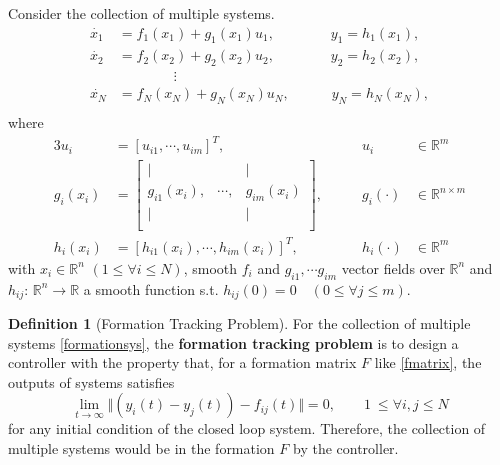 \documentclass[11pt, a4paper, oneside, openany, reqno]{book}
\theoremstyle{definition}
\newtheorem{definition}[theorem]{Definition}
\theoremstyle{remark}
\numberwithin{equation}{chapter} %
\newcommand{\R}{\ensuremath{{\mathbb R}}}
\begin{document}
Consider the collection of multiple systems.
\begin{equation}\begin{split}\label{formationsys}
	\dot{x_1} &=f_1(x_1)+g_1(x_1)u_1, \qquad\qquad  y_1 = h_1(x_1), \\
	\dot{x_2} &=f_2(x_2)+g_2(x_2)u_2, \qquad\qquad  y_2 = h_2(x_2),\\
	& \qquad \qquad \vdots \\
	\dot{x_N} &=f_N(x_N)+g_N(x_N)u_N, \qquad\quad  y_N = h_N(x_N),\\
\end{split}\end{equation} 
where
\begin{alignat*}{3}
	u_i&=\left[u_{i1} ,\cdots ,u_{im}\right]^T ,  \qquad & u_i & \in \R^m \\
	g_i(x_i)&=\left[ \begin{array}{ccc}
	\vert & & \vert \\
	g_{i1} (x_i), & \cdots , & g_{im} (x_i) \\
	\vert & & \vert \\
	\end{array} \right],   \qquad & g_i(\cdot) & \in \R^{n \times m} \\
	h_i(x_i)&=\left[h_{i1} (x_i) ,\cdots ,h_{im} (x_i) \right]^T , \qquad & h_i(\cdot) & \in \R^m  
\end{alignat*} 
with $ x_i \in \R^n $ $ (1 \leq \forall i \leq N) $,  
smooth $ f_i $ and $ g_{i1} ,\cdots g_{im} $ vector fields over $\R^n$ 
and $ h_{ij} $: $\R^n \rightarrow \R$ 
a smooth function s.t. $ h_{ij}(0)=0 \quad (0 \leq \forall j \leq m) $. 

\begin{definition}[Formation Tracking Problem]
	For the collection of multiple systems \eqref{formationsys},
	the \textbf{formation tracking problem} is to design a controller with the property that,
	for a formation matrix $ F $ like \eqref{fmatrix},
	the outputs of systems satisfies
	\begin{equation}
		\lim_{t \to \infty}\Vert \left(y_i(t) - y_j(t) \right) - f_{ij}(t) \Vert = 0, 
		\qquad 1\ \leq \forall i,j \leq N 	
	\end{equation}
	for any initial condition of the closed loop system. Therefore, 
	the collection of multiple systems would be in the formation $ F $ by the controller.
\end{definition}
\end{document}
